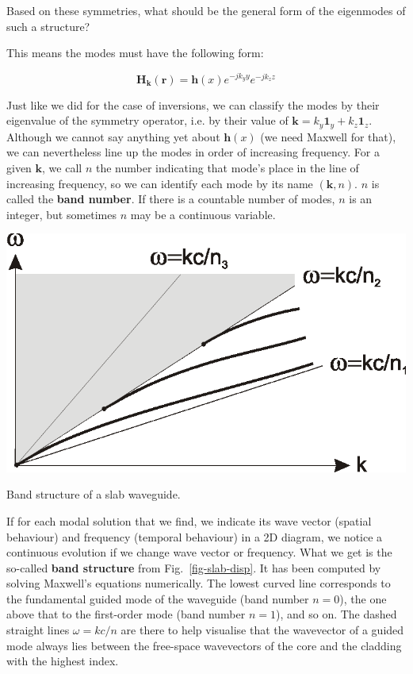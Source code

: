 \begin{cue}
Based on these symmetries, what should be the general form of the eigenmodes of such a structure?
\end{cue}

This means the modes must have the following form:

\begin{equation}
{\mathbf H}_{\mathbf k}({\mathbf r}) = {\mathbf h}(x) e^{-j k_y y} e^{-j k_z z} 
\end{equation} 

Just like we did for the case of inversions, we can classify the modes by their eigenvalue of the symmetry operator, i.e. by their value of ${\mathbf k} = k_y {\mathbf 1}_y + k_z {\mathbf 1}_z$. Although we cannot say anything yet about ${\mathbf h}(x)$ (we need Maxwell for that), we can nevertheless line up the modes in order of increasing frequency. For a given ${\mathbf k}$, we call $n$ the number indicating that mode's place in the line of increasing frequency, so we can identify each mode by its name $({\mathbf k},n)$.
$n$ is called the \textbf{band number}. If there is a countable number of modes, $n$ is an integer, but sometimes $n$ may be a continuous variable. 

\begin{marginfigure}
\centering
\includegraphics{symmetry/figures/slabdisp}
\caption{Band structure of a slab waveguide.}
\label{fig-slab-disp}
\end{marginfigure}

If for each modal solution that we find, we indicate its wave vector (spatial behaviour) and frequency (temporal behaviour) in a 2D diagram, we notice a continuous evolution if we change wave vector or frequency. What we get is the so-called \textbf{band structure} from Fig.~\ref{fig-slab-disp}. It has been computed by solving Maxwell's equations numerically. The lowest curved line corresponds to the fundamental guided mode of the waveguide (band number $n=0$), the one above that to the first-order mode (band number $n=1$), and so on. The dashed straight lines $\omega=kc/n$ are there to help visualise that the wavevector of a guided mode always lies between the free-space wavevectors of the core and the cladding with the highest index.

